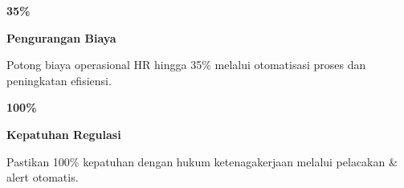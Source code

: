 \documentclass[a4paper]{article}
\begin{document}
\begin{minipage}[t]{0.485\textwidth}
    \noindent\colorbox{BlueBg}{%
        \begin{minipage}[t]{\dimexpr\linewidth-2\fboxsep}
            \vspace{6pt}
            {\fontsize{20}{24}\selectfont\bfseries\color{BluePrimary} 35\%}\par\vspace{2pt}
            {\fontsize{9.5}{12}\selectfont\bfseries\color{BlueDark} Pengurangan Biaya}\par\vspace{2pt}
            {\fontsize{8.5}{11}\selectfont\color{TextDark}Potong biaya operasional HR hingga 35\% melalui otomatisasi proses dan peningkatan efisiensi.}%
            \vspace{6pt}
        \end{minipage}}%
    \vspace{6pt}
    \noindent\colorbox{BlueBg}{%
        \begin{minipage}[t]{\dimexpr\linewidth-2\fboxsep}
            \vspace{6pt}
            {\fontsize{20}{24}\selectfont\bfseries\color{BluePrimary} 100\%}\par\vspace{2pt}
            {\fontsize{9.5}{12}\selectfont\bfseries\color{BlueDark} Kepatuhan Regulasi}\par\vspace{2pt}
            {\fontsize{8.5}{11}\selectfont\color{TextDark}Pastikan 100\% kepatuhan dengan hukum ketenagakerjaan melalui pelacakan \& alert otomatis.}%
            \vspace{6pt}
        \end{minipage}}%
\end{minipage}

\vspace{8pt}
\end{document}
